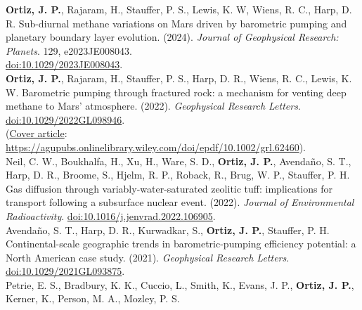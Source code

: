 \documentclass[11pt, letterpaper]{article}
\newcommand{\years}[1]{\marginnote{\scriptsize #1}}
\begin{document}
\noindent
\hypersetup{linkcolor=black,citecolor=blue,filecolor=black,urlcolor=black} 
%
\years{2024}\textbf{Ortiz, J. P.}, Rajaram, H., Stauffer, P. S., Lewis, K. W,
Wiens, R. C., Harp, D. R.  Sub-diurnal methane variations on Mars driven by
barometric pumping and planetary boundary layer evolution. (2024). \emph{Journal of
Geophysical Research: Planets}. 129, e2023JE008043. \\
\href{https://agupubs.onlinelibrary.wiley.com/doi/epdf/10.1029/2023JE008043}{doi:10.1029/2023JE008043}.
\JournalofGeophysicalOOOOSubDiurnalMethaneVar \\ 
%
\years{2022}\textbf{Ortiz, J. P.}, Rajaram, H., Stauffer, P. S., Harp, D. R.,
Wiens, R. C., Lewis, K. W.  Barometric pumping through fractured rock: a
mechanism for venting deep methane to Mars' atmosphere. (2022). \emph{Geophysical
Research Letters}. 
\href{https://agupubs.onlinelibrary.wiley.com/doi/epdf/10.1029/2022GL098946}{doi:10.1029/2022GL098946}.
\GeophysicalResearchLOOOOBarometricpumpingthr\\
\hypersetup{linkcolor=black,citecolor=blue,filecolor=black,urlcolor=blue} 
(\underline{Cover article}:
\href{https://agupubs.onlinelibrary.wiley.com/doi/epdf/10.1002/grl.62460}{https://agupubs.onlinelibrary.wiley.com/doi/epdf/10.1002/grl.62460}).\\ 
%
\hypersetup{linkcolor=black,citecolor=blue,filecolor=black,urlcolor=black} 
\years{2022}Neil, C. W., Boukhalfa, H., Xu, H., Ware, S. D., \textbf{Ortiz, J.
P.}, Avendaño, S. T., Harp, D. R., Broome, S., Hjelm, R. P., Roback, R., Brug,
W. P., Stauffer, P. H. Gas diffusion through variably-water-saturated zeolitic
tuff: implications for transport following a subsurface nuclear event. (2022).
\emph{Journal of Environmental Radioactivity}.
\href{https://www.sciencedirect.com/science/article/pii/S0265931X22000959/pdfft?md5=9a2aafb80eab7a1daa481601c5af9247&pid=1-s2.0-S0265931X22000959-main.pdf}{doi:10.1016/j.jenvrad.2022.106905}.
\JournalofEnvironmentOOOOGasdiffusionthroughv\\
%
\years{2021}Avendaño, S. T., Harp, D. R., Kurwadkar, S., \textbf{Ortiz, J.
P.}, Stauffer, P. H. Continental-scale geographic trends in barometric-pumping
efficiency potential: a North American case study. (2021). 
\emph{Geophysical Research Letters}.  
\href{https://agupubs.onlinelibrary.wiley.com/doi/pdf/10.1029/2021GL093875}{doi:10.1029/2021GL093875}.
\GeophysicalResearchLOOOOContinentalScaleGeog\\
%
\years{2020}Petrie, E. S., Bradbury, K. K., Cuccio, L., Smith, K., Evans, J.
P., \textbf{Ortiz, J. P.}, Kerner, K., Person, M. A., Mozley, P. S.
\end{document}
